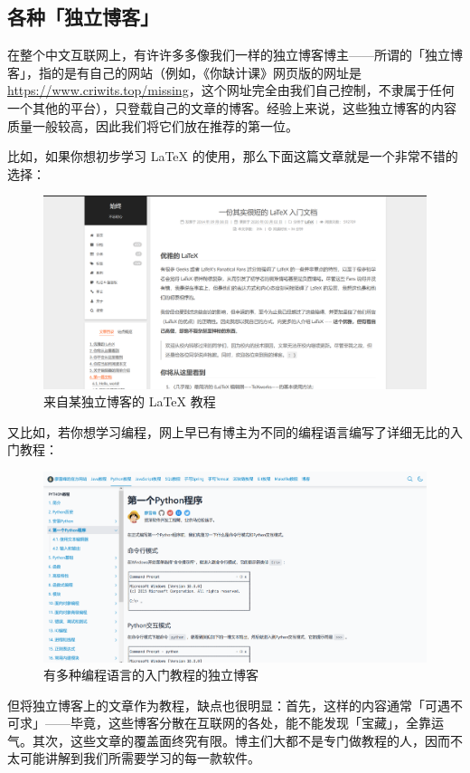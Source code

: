 \subsection{各种「独立博客」}

在整个中文互联网上，有许许多多像我们一样的独立博客博主——所谓的「独立博客」，指的是有自己的网站（例如，《你缺计课》网页版的网址是 \url{https://www.criwits.top/missing}，这个网址完全由我们自己控制，不隶属于任何一个其他的平台），只登载自己的文章的博客。经验上来说，这些独立博客的内容质量一般较高，因此我们将它们放在推荐的第一位。

比如，如果你想初步学习 \LaTeX{} 的使用，那么下面这篇文章就是一个非常不错的选择：

\begin{figure}[htb!]
  \centering
  \includegraphics[width=.7\textwidth]{assets/software/LaTeX_tutorial.png}
  \caption{来自某独立博客的 \LaTeX{} 教程}
  \label{fig:LaTeX_tutorial}
\end{figure}

又比如，若你想学习编程，网上早已有博主为不同的编程语言编写了详细无比的入门教程：

\begin{figure}[htb!]
  \centering
  \includegraphics[width=.7\textwidth]{assets/software/LXF_mainpage.png}
  \caption{有多种编程语言的入门教程的独立博客}
  \label{fig:LXF_mainpage}
\end{figure}

但将独立博客上的文章作为教程，缺点也很明显：首先，这样的内容通常「可遇不可求」——毕竟，这些博客分散在互联网的各处，能不能发现「宝藏」，全靠运气。其次，这些文章的覆盖面终究有限。博主们大都不是专门做教程的人，因而不太可能讲解到我们所需要学习的每一款软件。

